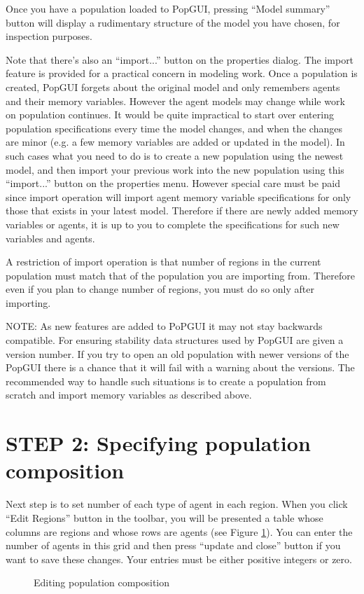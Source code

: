 Once you have a population loaded to PopGUI, pressing ``Model summary'' button will display a rudimentary structure of the model you have chosen, for inspection purposes. 

Note that there's also an ``import...'' button on the properties dialog. The import feature is provided for a practical concern in modeling work. Once a population is created, PopGUI forgets about the original model and only remembers agents and their memory variables. However the agent models may change while work on population continues. It would be quite impractical to start over entering population specifications every time the model changes, and when the changes are minor (e.g. a few memory variables are added or updated in the model). In such cases what you need to do is to create a new population using the newest model, and then import your previous work into the new population using this ``import...'' button on the properties menu. However special care must be paid since import operation will import agent memory variable specifications for only those that exists in your latest model. Therefore if there are newly added memory variables or agents, it is up to you to complete the specifications for such new variables and agents.

A restriction of import operation is that number of regions in the current population must match that of the population you are importing from. Therefore even if you plan to change number of regions, you must do so only after importing.

NOTE: As new features are added to PoPGUI it may not stay backwards compatible. For ensuring stability data structures used by PopGUI are given a version number. If you try to open an old population with newer versions of the PopGUI there is a chance that it will fail with a warning about the versions. The recommended way to handle such situations is to create a population from scratch and import memory variables as described above.

\section{STEP 2: Specifying population composition}
Next step is to set number of each type of agent in each region. When you click ``Edit Regions'' button in the toolbar, you will be presented a table whose columns are regions and whose rows are agents (see Figure \ref{fig:regions}). You can enter the number of agents in this grid and then press ``update and close'' button if you want to save these changes. Your entries must be either positive integers or zero. 
\begin{figure}
\caption{Editing population composition}
\label{fig:regions}
\end{figure}

